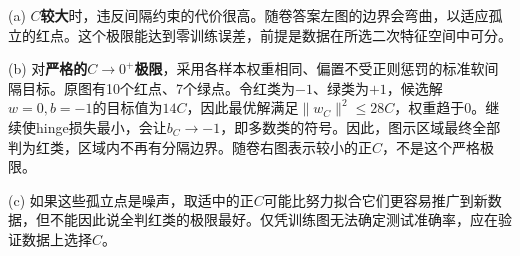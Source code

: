 (a) \textbf{\(C\)较大}时，违反间隔约束的代价很高。随卷答案左图的边界会弯曲，以适应孤立的红点。这个极限能达到零训练误差，前提是数据在所选二次特征空间中可分。


(b) 对\textbf{严格的\(C\to0^+\)极限}，采用各样本权重相同、偏置不受正则惩罚的标准软间隔目标。原图有10个红点、7个绿点。令红类为\(-1\)、绿类为\(+1\)，候选解\(w=0,b=-1\)的目标值为\(14C\)，因此最优解满足\(\|w_C\|^2\le28C\)，权重趋于0。继续使hinge损失最小，会让\(b_C\to-1\)，即多数类的符号。因此，图示区域最终全部判为红类，区域内不再有分隔边界。随卷右图表示较小的正\(C\)，不是这个严格极限。


(c) 如果这些孤立点是噪声，取适中的正\(C\)可能比努力拟合它们更容易推广到新数据，但不能因此说全判红类的极限最好。仅凭训练图无法确定测试准确率，应在验证数据上选择\(C\)。
